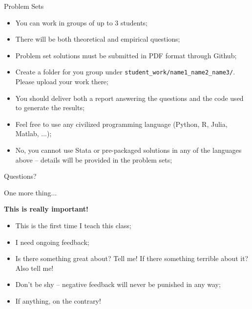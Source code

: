 \documentclass[aspectratio=169, xcolor=dvipsnames, 12pt]{beamer}
\begin{document}
\begin{frame}{Problem Sets}
\begin{itemize}
  \item You can work in groups of up to 3 students;
  \item There will be both theoretical and empirical questions;
  \item Problem set solutions must be submitted in PDF format through Github;
  \item Create a folder for you group under \texttt{student\_work/name1\_name2\_name3/}. Please upload your work there;
  \item You should deliver both a report answering the questions and the code used to generate the results;
  \item Feel free to use any civilized programming language (Python, R, Julia, Matlab, ...);
  \item No, you cannot use Stata or pre-packaged solutions in any of the languages above -- details will be provided in the problem sets;
\end{itemize}
\end{frame}

\begin{frame}[standout]
Questions?
\end{frame}

\begin{frame}{One more thing...}
  \begin{center}
    \alert{\textbf{This is really important!}}
  \end{center}
  \begin{itemize}
    \item This is the first time I teach this class;
    \item I need ongoing feedback;
    \item Is there something great about? Tell me! If there something terrible about it? Also tell me!
    \item Don't be shy -- negative feedback will never be punished in any way;
    \item If anything, on the contrary!
  \end{itemize}
\end{frame}
\end{document}
